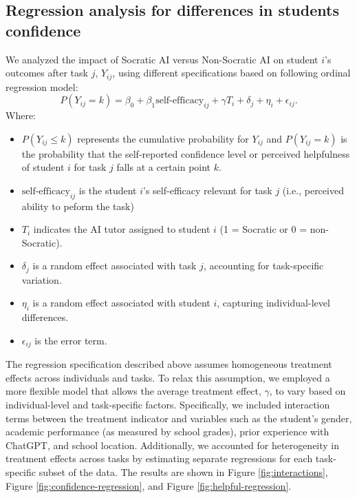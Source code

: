 \documentclass[
  11pt,
]{article}
\begin{document}
\subsection{Regression analysis for differences in students confidence}\label{sec:regress-confidence}

We analyzed the impact of Socratic AI versus Non-Socratic AI on student \(i\)'s outcomes after task \(j\), \(Y_{ij}\), using different specifications based on following ordinal regression model:
\[
  P(Y_{ij} = k) = 
    \beta_0 + \beta_1 \text{self-efficacy}_{ij} + \gamma T_{i} 
    + \delta_j + \eta_i + \epsilon_{ij}.
\]
Where:

\begin{itemize}
\item
  \(P(Y_{ij} \leq k)\) represents the cumulative probability for \(Y_{ij}\) and \(P(Y_{ij} = k)\) is the probability that the self-reported confidence level or perceived helpfulness of student \(i\) for task \(j\) falls at a certain point \(k\).
\item
  \(\text{self-efficacy}_{ij}\) is the student \(i\)'s self-efficacy relevant for task \(j\) (i.e., perceived ability to peform the task)
\item
  \(T_i\) indicates the AI tutor assigned to student \(i\) (1 = Socratic or 0 = non-Socratic).
\item
  \(\delta_j\) is a random effect associated with task \(j\), accounting for task-specific variation.
\item
  \(\eta_i\) is a random effect associated with student \(i\), capturing individual-level differences.
\item
  \(\epsilon_{ij}\) is the error term.
\end{itemize}

The regression specification described above assumes homogeneous treatment effects across individuals and tasks. To relax this assumption, we employed a more flexible model that allows the average treatment effect, \(\gamma\), to vary based on individual-level and task-specific factors. Specifically, we included interaction terms between the treatment indicator and variables such as the student's gender, academic performance (as measured by school grades), prior experience with ChatGPT, and school location. Additionally, we accounted for heterogeneity in treatment effects across tasks by estimating separate regressions for each task-specific subset of the data. The results are shown in Figure \ref{fig:interactions}, Figure \ref{fig:confidence-regression}, and Figure \ref{fig:helpful-regression}.
\end{document}
